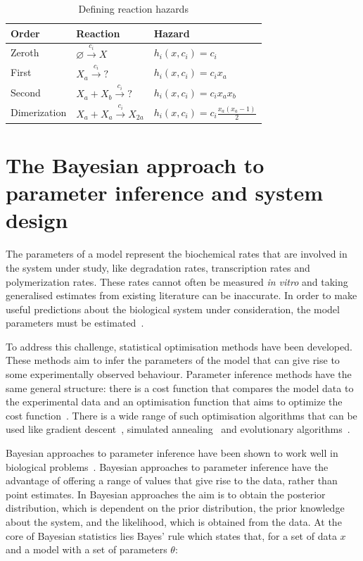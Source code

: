 \begin{table}[h]
\centering
\caption{Defining reaction hazards}
\label{tab:hazards}
\begin{tabular}{@{}lll@{}}
\toprule
Order & Reaction & Hazard \\ \midrule
Zeroth & $\varnothing \xrightarrow{c_i}X $ & $h_i(x, c_i) = c_i$ \\
First & $X_a \xrightarrow{c_i} ? $ & $h_i(x, c_i) = c_{i}x_a$ \\
Second & $X_a + X_b \xrightarrow{c_i} ? $ & $h_i(x, c_i) = c_{i}x_{a}x_b$ \\
Dimerization & $X_a + X_a \xrightarrow{c_i} X_{2a} $ & $h_i(x, c_i) = c_{i}\frac{x_{a}(x_{a}-1)}{2}$ \\ \bottomrule
\end{tabular}
\end{table}


\section{The Bayesian approach to parameter inference and system design}

The parameters of a model represent the biochemical rates that are involved in the system under study, like degradation rates, transcription rates and polymerization rates. These rates cannot often be measured \textit{in vitro} and taking generalised estimates from existing literature can be inaccurate. In order to make useful predictions about the biological system under consideration, the model parameters must be estimated~\autocite{Zheng:2010bp}. 

To address this challenge, statistical optimisation methods have been developed. These methods aim to infer the parameters of the model that can give rise to some experimentally observed behaviour. Parameter inference methods have the same general structure: there is a cost function that compares the model data to the experimental data and an optimisation function that aims to optimize the cost function~\autocite{Toni:2010}. There is a wide range of such optimisation algorithms that can be used like gradient descent~\autocite{Levenberg:1944we, Marquardt:1963wr}, simulated annealing~\autocite{Kirkpatrick:1983kv} and evolutionary algorithms~\autocite{Onbasoglu:2001um, Wood:2002uo}.  

Bayesian approaches to parameter inference have been shown to work well in biological problems~\autocite{Barnes:2011hh, Toni:2010, Liepe:2014iw}. Bayesian approaches to parameter inference have the advantage of offering a range of values that give rise to the data, rather than point estimates. In Bayesian approaches the aim is to obtain the posterior distribution, which is dependent on the prior distribution, the prior knowledge about the system, and the likelihood, which is obtained from the data. At the core of Bayesian statistics lies Bayes' rule which states that, for a set of data $x$ and a model with a set of parameters $θ$:

